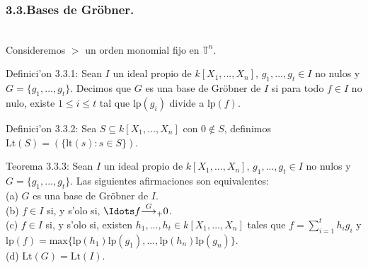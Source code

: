 \documentclass[10pt]{beamer}
\renewcommand{\T}{\mathbb{T}^n}
\renewcommand{\lp}{\text{lp}}
\renewcommand{\lt}{\text{lt}}
\renewcommand{\Lt}{\text{Lt}}
\begin{document}
\begin{frame}
\frametitle{3.3.Bases de Gr\"obner.}\\
Consideremos $>$ un orden monomial fijo en $\T$.\\
\begin{block}{Definici'on 3.3.1:}
Sean $I$ un ideal propio de $k[X_1,...,X_n]$, $g_1,...,g_t \in I$ no nulos y $G=\{ g_1,...,g_t\}$. Decimos que $G$ es una base de Gr\"obner de $I$ si para todo $f \in I$ no nulo, existe $1 \leq i \leq t$ tal que $\lp(g_i)$ divide a $\lp(f)$.\\
\end{block}
\begin{block}{Definici'on 3.3.2:}
Sea $S \subseteq k[X_1,...,X_n]$ con $0 \not \in S$, definimos $\Lt(S)=(\{\lt(s):s \in S \})$.\\
\end{block}
\begin{block}{Teorema 3.3.3:}
Sean $I$ un ideal propio de $k[X_1,...,X_n]$, $g_1,...,g_t \in I$ no nulos y $G=\{g_1,...,g_t\}$. Las siguientes afirmaciones son equivalentes:\\
(a) $G$ es una base de Gr\"obner de $I$.\\
(b) $f \in I$ si, y s'olo si, $\displaystyle \Idots f {\overset{G}{\longrightarrow}}_{+} 0$.\\
(c) $f \in I$ si, y s'olo si, existen $h_1,...,h_t \in k[X_1,...,X_n]$ tales que $f = \sum^{t}_{i=1}{h_ig_i}$ y $\lp(f)=\text{max}\{\lp(h_1)\lp(g_1),...,\lp(h_n)\lp(g_n)\}$.\\
(d) $\Lt(G)=\Lt(I)$.\\
\end{block}
\end{frame}
\end{document}
